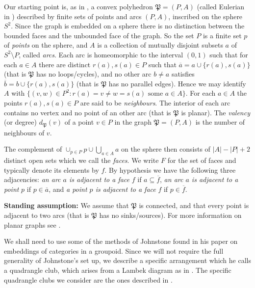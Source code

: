 \documentclass[12pt]{amsart}
\theoremstyle{definition}
\theoremstyle{remark}
\numberwithin{equation}{section}
\begin{document}
\noindent
Our starting point is, as in \cite[\S 1]{Lambek}, a convex  polyhedron $\mathfrak{P}=(P,A)$ (called Eulerian in \cite{Lambek}) described by finite sets of points and arcs $(P, A)$, inscribed on the sphere $S^2$. Since the graph is embedded on a sphere there is no distinction between the bounded faces and the unbounded face of the graph. So the set $P$ is a finite set $p$ of \emph{points} on the sphere, and $A$ is a collection of mutually disjoint subsets $a$ of $S^2 \setminus P$, called \emph{arcs}.  Each arc is homeomorphic to the interval $(0,1)$ such that for each $a \in A$ there are distinct $r(a), s(a) \in P$ such that $\overline{a} = a \cup \{r(a), s(a)\}$ (that is $\mathfrak{P}$ has no loops/cycles), and no other arc $b \neq a$ satisfies $\overline{b}=b \cup \{r(a), s(a)\}$ (that is $\mathfrak{P}$ has no parallel edges). Hence we may identify $A$ with $\{ (v,w) \in P^2 : r(a) =v \neq  w=s(a) \text{ some } a \in A \}$. For each $a \in A$ the points $r(a), s(a) \in P$ are said to be \emph{neighbours}. The interior of each arc contains no vertex and no point of an other arc (that is $\mathfrak{P}$ is planar). The \emph{valency} (or degree) $d_{\mathfrak{P}} (v)$ of a point $v \in P$ in the graph $\mathfrak{P}=(P,A)$ is the number of neighbours of $v$.

The complement of $\cup_{p\in P} p \cup \bigcup_{a \in A} a$ on the sphere then consists of $|A| - |P| + 2$ distinct open sets which we call the \emph{faces}. We write $F$ for the set of faces and typically denote its elements by $f$. By hypothesis we have the following three adjacencies: \emph{an arc $a$ is adjacent to a face} $f$ if $a \subseteq \overline{f}$, \emph{an arc $a$ is adjacent to a point} $p$ if $p \in \overline{a}$, and \emph{a point $p$ is adjacent to a face} $f$ if $p \in \overline{f}$. 

\textbf{Standing assumption:} We assume that $\mathfrak{P}$ is connected, and that every point is adjacent to two arcs (that is $\mathfrak{P}$ has no sinks/sources).  For more information on planar graphs see \cite[\S4]{D}.



\noindent
We shall need to use some of the methods of Johnstone \cite{Johnstone} found in his paper on embeddings of categories in a groupoid. Since we will not require the full generality of Johnstone's set up, we describe a specific arrangement  which he calls a quadrangle club, which arises from a Lambek diagram as in \cite{Lambek}. The specific quadrangle clubs we consider are the ones described in \cite[\S 6]{Johnstone}.
\end{document}
